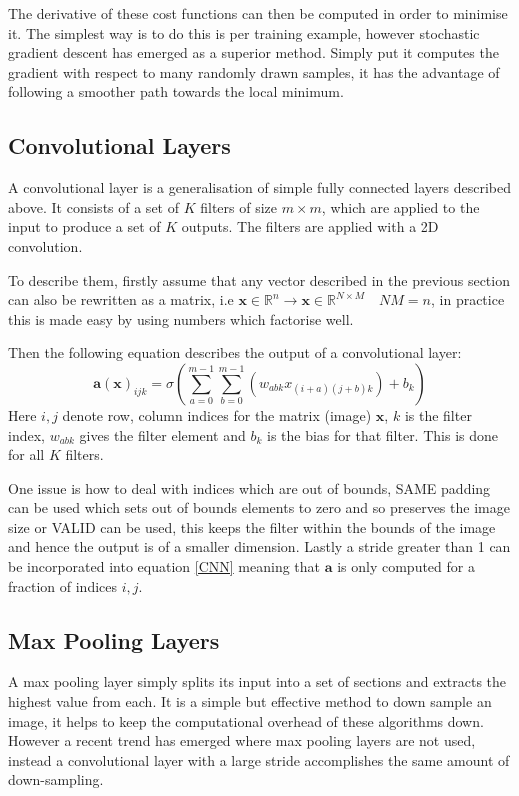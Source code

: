 The derivative of these cost functions can then be computed in order to minimise it.
The simplest way is to do this is per training example, however stochastic gradient
descent\cite{Amari1993} has emerged as a superior method. Simply put it computes the gradient with respect
to many randomly drawn samples, it has the advantage of following a smoother path
towards the local minimum.
\subsection{Convolutional Layers}
A convolutional layer is a generalisation of simple fully connected layers described
above. It consists of a set of $K$ filters of size $m\times m$, which are applied to the input to produce
a set of $K$ outputs. The filters are applied with a 2D convolution.


To describe them, firstly assume that any vector described in the previous section
can also be rewritten as a matrix, i.e $\mathbf{x} \in \mathbb{R}^{n}
\rightarrow \mathbf{x} \in \mathbb{R}^{N \times M} \quad NM=n$, in practice this is made
easy by using numbers which factorise well.

Then the following equation describes the output of a convolutional layer:
\begin{equation} \label{CNN}
    \mathbf{a}(\mathbf{x})_{ijk} = \sigma \left ( \sum_{a=0}^{m-1}\sum_{b=0}^{m-1}(w_{abk}x_{(i+a)(j+b)k}) + b_k \right )
\end{equation}
Here $i,j$  denote row, column indices for the matrix (image) $\mathbf{x}$, $k$ is the filter index, $w_{abk}$
gives the filter element and $b_k$ is the bias for that filter. This is done for all $K$ filters.

One issue is how to deal with indices which are out of bounds, SAME padding can be used which sets out of bounds
elements to zero and so preserves the image size or VALID can be used, this keeps the filter within the bounds of the
image and hence the output is of a smaller dimension. Lastly a stride greater than 1 can be incorporated into equation
\ref{CNN} meaning that $\mathbf{a}$ is only computed for a fraction of indices $i,j$.
\subsection{Max Pooling Layers}
A max pooling layer simply splits its input into a set of sections and extracts
the highest value from each. It is a simple but effective method to down sample
an image, it helps to keep the computational overhead of these algorithms
down. However a recent trend \cite{Springenberg2015} has emerged where max pooling
layers are not used, instead a convolutional layer with a large stride accomplishes
the same amount of down-sampling.
